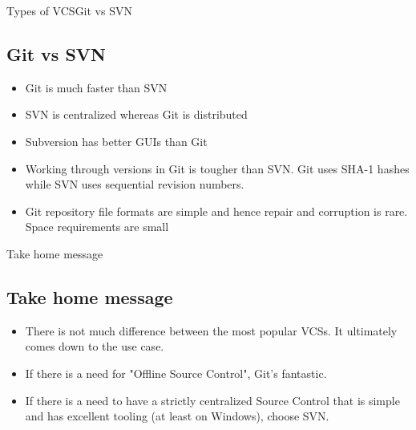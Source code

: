 \documentclass{beamer}
\begin{document}
\begin{frame}{Types of VCS}{Git vs SVN}
\subsection{Git vs SVN}
\begin{itemize}
    \item Git is much faster than SVN
    \item SVN is centralized whereas Git is distributed
    \item Subversion has better GUIs than Git
    \item Working through versions in Git is tougher than SVN. Git uses SHA-1 hashes while SVN uses sequential revision numbers.
    \item Git repository file formats are simple and hence  repair and corruption is rare. Space requirements are small
\end{itemize}
    
\end{frame}

\begin{frame}{Take home message}
\subsection{Take home message}
\begin{itemize}
    \item There is not much difference between the most popular VCSs. It ultimately comes down to the use case.
    \item If there is a need for "Offline Source Control", Git's fantastic. 
    \item If there is a need to have a strictly centralized Source Control that is simple and has excellent tooling (at least on Windows), choose SVN.
\end{itemize}
    
\end{frame}



\end{document}
